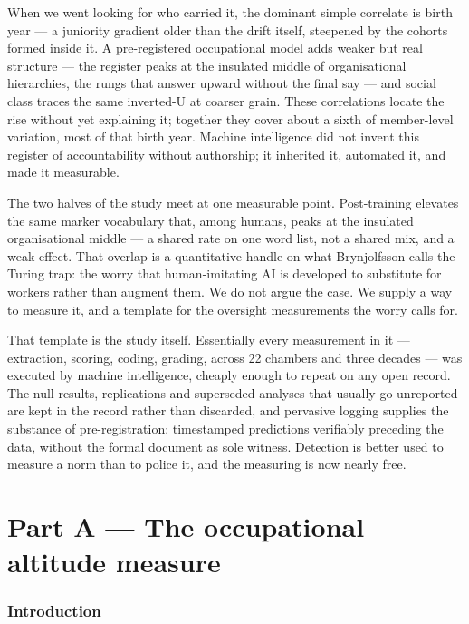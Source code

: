 When we went looking for who carried it, the dominant simple correlate is birth year --- a juniority gradient older than the drift itself, steepened by the cohorts formed inside it. A pre-registered occupational model adds weaker but real structure --- the register peaks at the insulated middle of organisational hierarchies, the rungs that answer upward without the final say --- and social class traces the same inverted-U at coarser grain. These correlations locate the rise without yet explaining it; together they cover about a sixth of member-level variation, most of that birth year. Machine intelligence did not invent this register of accountability without authorship; it inherited it, automated it, and made it measurable.

The two halves of the study meet at one measurable point. Post-training elevates the same marker vocabulary that, among humans, peaks at the insulated organisational middle --- a shared rate on one word list, not a shared mix, and a weak effect. That overlap is a quantitative handle on what Brynjolfsson\cite{brynjolfsson2022} calls the Turing trap: the worry that human-imitating AI is developed to substitute for workers rather than augment them. We do not argue the case. We supply a way to measure it, and a template for the oversight measurements the worry calls for.

That template is the study itself. Essentially every measurement in it --- extraction, scoring, coding, grading, across 22 chambers and three decades --- was executed by machine intelligence, cheaply enough to repeat on any open record. The null results, replications and superseded analyses that usually go unreported are kept in the record rather than discarded, and pervasive logging supplies the substance of pre-registration: timestamped predictions verifiably preceding the data, without the formal document as sole witness. Detection is better used to measure a norm than to police it, and the measuring is now nearly free.

\part*{Part A --- The occupational altitude measure}\setcounter{section}{0}

\section{Introduction}\label{sec:a-intro}

